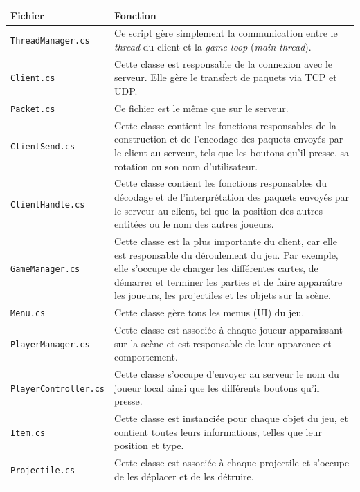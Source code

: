 \documentclass[a4paper]{article}
\begin{document}
\begin{center}
\begin{longtable}{|l|p{10cm}|}
    \hline
    Fichier & Fonction \\
    \hline\hline
    \texttt{ThreadManager.cs}\footnotemark[1] & Ce script gère simplement la communication entre le \textit{thread} du client et la \textit{game loop} (\textit{main thread}).\\
    \hline
    \texttt{Client.cs}\footnotemark[1] & Cette classe est responsable de la connexion avec le serveur. Elle gère le transfert de paquets via TCP et UDP.\\
    \hline
    \texttt{Packet.cs}\footnotemark[1] & Ce fichier est le même que sur le serveur.\\
    \hline
    \texttt{ClientSend.cs} & Cette classe contient les fonctions responsables de la construction et de l’encodage des paquets envoyés par le client au serveur, tels que les boutons qu’il presse, sa rotation ou son nom d’utilisateur.\\
    \hline
    \texttt{ClientHandle.cs} & Cette classe contient les fonctions responsables du décodage et de l'interprétation des paquets envoyés par le serveur au client, tel que la position des autres entitées ou le nom des autres joueurs.\\
    \hline
    \texttt{GameManager.cs} & Cette classe est la plus importante du client, car elle est responsable du déroulement du jeu. Par exemple, elle s’occupe de charger les différentes cartes, de démarrer et terminer les parties et de faire apparaître les joueurs, les projectiles et les objets sur la scène.\\
    \hline
    \texttt{Menu.cs} & Cette classe gère tous les menus (UI) du jeu.\\
    \hline
    \texttt{PlayerManager.cs} & Cette classe est associée à chaque joueur apparaissant sur la scène et est responsable de leur apparence et comportement.\\
    \hline
    \texttt{PlayerController.cs} & Cette classe s’occupe d'envoyer au serveur le nom du joueur local ainsi que les différents boutons qu’il presse.\\
    \hline
    \texttt{Item.cs} & Cette classe est instanciée pour chaque objet du jeu, et contient toutes leurs informations, telles que leur position et type.\\
    \hline
    \texttt{Projectile.cs} & Cette classe est associée à chaque projectile et s’occupe de les déplacer et de les détruire.\\

\end{longtable}
\end{center}
\end{document}
